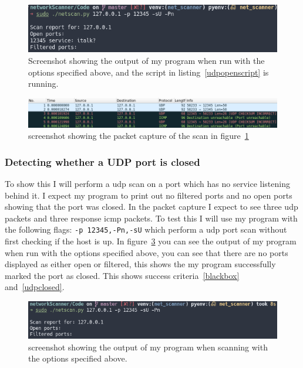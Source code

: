 \documentclass[titlepage]{article}
\let\Oldsubsubsection\subsubsection{}
\renewcommand{\subsubsection}{\FloatBarrier\Oldsubsubsection}
\begin{document}
\begin{figure}[H]
  \centering
  \includegraphics[width=\textwidth]{udpopenoutput.png}
  \caption{%
    Screenshot showing the output of my program when run with the options specified
    above, and the script in listing~\ref{udpopenscript} is running.
  }\label{udpopenoutput}
\end{figure}

\begin{figure}[H]
  \centering
  \includegraphics[width=\textwidth]{udpopenpcap.png}
  \caption{%
    screenshot showing the packet capture of the scan in figure~\ref{udpopenoutput}
  }\label{udpopenpcap}
\end{figure}

\subsubsection{Detecting whether a UDP port is closed}
To show this I will perform a \gls{udp} scan on a port which
has no service listening behind it. I expect my program to print out
no filtered ports and no open ports showing that the port was closed.
In the packet capture I expect to see three \gls{udp} packets and three response
\gls{icmp} packets. To test this I will use my program with the following flags:
\verb|-p 12345,-Pn,-sU| which perform a \gls{udp} port scan without first checking
if the host is up. In figure~\ref{udpclosedoutput} you can see the output of my program
when run with the options specified above, you can see that there are no ports displayed
as either open or filtered, this shows the my program successfully marked the port as closed.
This shows success criteria~\ref{blackbox} and~\ref{udpclosed}.

\begin{figure}[H]
  \centering
  \includegraphics[width=\textwidth]{udpclosedoutput.png}
  \caption{%
    screenshot showing the output of my program when scanning with the
    options specified above.
  }\label{udpclosedoutput}
\end{figure}
\end{document}
